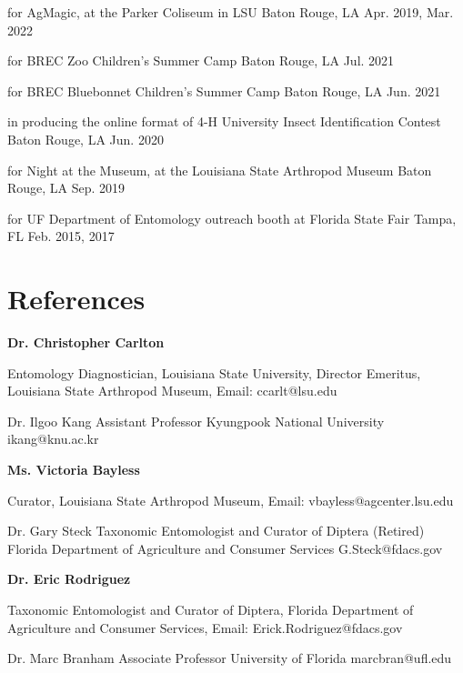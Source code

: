 \documentclass{article}
\begin{document}
{for AgMagic, at the Parker Coliseum in LSU}
{Baton Rouge, LA}
{Apr. 2019, Mar. 2022}

{for BREC Zoo Children’s Summer Camp}
{Baton Rouge, LA}
{Jul. 2021}

{for BREC Bluebonnet Children’s Summer Camp}
{Baton Rouge, LA}
{Jun. 2021}

{in producing the online format of 4-H University Insect Identification Contest}
{Baton Rouge, LA}
{Jun. 2020}

{for Night at the Museum, at the Louisiana State Arthropod Museum}
{Baton Rouge, LA}
{Sep. 2019}

{for UF Department of Entomology outreach booth at Florida State Fair}
{Tampa, FL}
{Feb. 2015, 2017}

\section{References}
\newcommand{\References}[5]{
    \noindent
    \begin{minipage}[t]{.25\textwidth}
    \textbf{#1} %
    \end{minipage}
    \begin{minipage}[t]{.70\textwidth}
    \noindent
    \small
    {#2}, %
    {#3}, %
    Email: {#4} %
    \end{minipage}
    \normalsize\par
}

\References{Dr. Christopher Carlton}
{Entomology Diagnostician, Louisiana State University}
{Director Emeritus, Louisiana State Arthropod Museum}
{ccarlt@lsu.edu}

\References{Dr. Ilgoo Kang}
{Assistant Professor}
{Kyungpook National University}
{ikang@knu.ac.kr}

\References{Ms. Victoria Bayless}
{Curator}
{Louisiana State Arthropod Museum}
{vbayless@agcenter.lsu.edu}

\References{Dr. Gary Steck}
{Taxonomic Entomologist and Curator of Diptera (Retired)}
{Florida Department of Agriculture and Consumer Services}
{G.Steck@fdacs.gov}

\References{Dr. Eric Rodriguez}
{Taxonomic Entomologist and Curator of Diptera}
{Florida Department of Agriculture and Consumer Services}
{Erick.Rodriguez@fdacs.gov}

\References{Dr. Marc Branham}
{Associate Professor}
{University of Florida}
{marcbran@ufl.edu}
  
\end{document}
